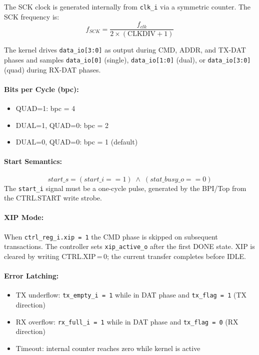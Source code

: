 The SCK clock is generated internally from \texttt{clk\_i} via a symmetric
counter. The SCK frequency is:
\[
  f_{SCK} = \frac{f_{clk}}{2 \times (\text{CLKDIV} + 1)}
\]

The kernel drives \texttt{data\_io[3:0]} as output during CMD, ADDR, and TX-DAT
phases and samples \texttt{data\_io[0]} (single), \texttt{data\_io[1:0]} (dual),
or \texttt{data\_io[3:0]} (quad) during RX-DAT phases.

\paragraph{Bits per Cycle (bpc):}
\begin{itemize}
  \item QUAD=1: bpc = 4
  \item DUAL=1, QUAD=0: bpc = 2
  \item DUAL=0, QUAD=0: bpc = 1 (default)
\end{itemize}

\paragraph{Start Semantics:}
\[
  start\_s = (start\_i == 1) \;\land\; (stat\_busy\_o == 0)
\]
The \texttt{start\_i} signal must be a one-cycle pulse, generated by the BPI/Top
from the CTRL.START write strobe.

\paragraph{XIP Mode:}
When \texttt{ctrl\_reg\_i.xip = 1} the CMD phase is skipped on subsequent
transactions. The controller sets \texttt{xip\_active\_o} after the first
DONE state. XIP is cleared by writing CTRL.XIP\,=\,0; the current transfer
completes before IDLE.

\paragraph{Error Latching:}
\begin{itemize}
  \item TX underflow: \texttt{tx\_empty\_i = 1} while in DAT phase and
    \texttt{tx\_flag = 1} (TX direction)
  \item RX overflow: \texttt{rx\_full\_i = 1} while in DAT phase and
    \texttt{tx\_flag = 0} (RX direction)
  \item Timeout: internal counter reaches zero while kernel is active
\end{itemize}

